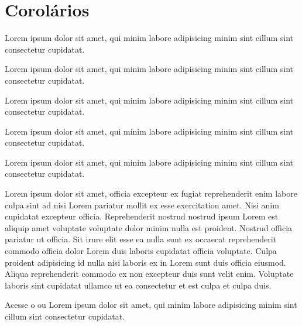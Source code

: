 \documentclass[12pt]{../libellum}
\begin{document}
  \section{Corolários}

  \begin{cor}
    Lorem ipsum dolor sit amet, qui minim labore adipisicing minim sint cillum sint consectetur cupidatat.
  \end{cor}

  Lorem ipsum dolor sit amet, qui minim labore adipisicing minim sint cillum sint consectetur cupidatat.

  \begin{lema}
    Lorem ipsum dolor sit amet, qui minim labore adipisicing minim sint cillum sint consectetur cupidatat.
  \end{lema}

 \begin{teorema}
   Lorem ipsum dolor sit amet, qui minim labore adipisicing minim sint cillum sint consectetur cupidatat.
 \end{teorema}

  \begin{definicao}
    Lorem ipsum dolor sit amet, qui minim labore adipisicing minim sint cillum sint consectetur cupidatat.
  \end{definicao}

  Lorem ipsum dolor sit amet, officia excepteur ex fugiat reprehenderit enim labore culpa sint ad nisi Lorem pariatur mollit ex esse exercitation amet. Nisi anim cupidatat excepteur officia. Reprehenderit nostrud nostrud ipsum Lorem est aliquip amet voluptate voluptate dolor minim nulla est proident. Nostrud officia pariatur ut officia. Sit irure elit esse ea nulla sunt ex occaecat reprehenderit commodo officia dolor Lorem duis laboris cupidatat officia voluptate. Culpa proident adipisicing id nulla nisi laboris ex in Lorem sunt duis officia eiusmod. Aliqua reprehenderit commodo ex non excepteur duis sunt velit enim. Voluptate laboris sint cupidatat ullamco ut ea consectetur et est culpa et culpa duis.

  Acesse o  ou Lorem ipsum dolor sit amet, qui minim labore adipisicing minim sint cillum sint consectetur cupidatat.
  \begin{center}
  \end{center}
\end{document}
